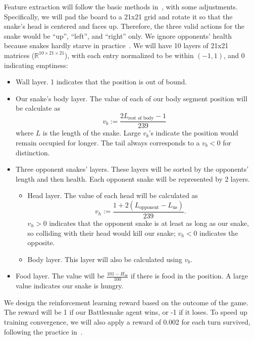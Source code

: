 \documentclass[a4paper]{article}
\begin{document}
Feature extraction will follow the basic methods
in~\cite{siddiqui2020multiagent,archinukmonte}, with some adjustments.
Specifically,
we will pad the board to a 21x21 grid and rotate it so that the snake's head is
centered and faces up. Therefore,
the three valid actions for the snake would be ``up'', ``left'',
and ``right'' only.
We ignore opponents' health because snakes hardly starve in
practice~\cite{siddiqui2020multiagent}.
We will have 10 layers of 21x21 matrices ($\mathbb R^{10\times21\times21}$),
with each entry normalized to be within $(-1,1)$, and 0 indicating emptiness:
\begin{itemize}
    \item Wall layer. 1 indicates that the position is out of bound.
    \item Our snake's body layer.
        The value of each of our body segment position will be calculate as $$
            v_b:=\frac{2L_{\text{rest of body}}-1}{239}
        $$ where $L$ is the length of the snake.
        Large $v_b$'s indicate the position would remain occupied for longer.
        The tail always corresponds to a $v_b<0$ for distinction.
    \item Three opponent snakes' layers.
          These layers will be sorted by the opponents' length and then health.
          Each opponent snake will be represented by 2 layers. \begin{itemize}
              \item Head layer. The value of each head will be calculated as $$
                        v_h:=\frac{1+2(L_{\text{opponent}}-L_{\text{us}})}{239}.
                    $$ $v_h>0$ indicates that the opponent snake is at least as
                    long as our snake,
                    so colliding with their head would kill our snake;
                    $v_h<0$ indicates the opposite.
              \item Body layer. This layer will also be calculated using $v_b$.
          \end{itemize}
    \item Food layer.
          The value will be $\displaystyle\frac{101-H_{\text{us}}}{100}$ if
          there is food in the position.
          A large value indicates our snake is hungry.
\end{itemize}

We design the reinforcement learning reward based on the outcome of the game.
The reward will be 1 if our Battlesnake agent wins, or -1 if it loses.
To speed up training convergence,
we will also apply a reward of 0.002 for each turn survived,
following the practice in~\cite{chung2020battlesnake}.
\end{document}

